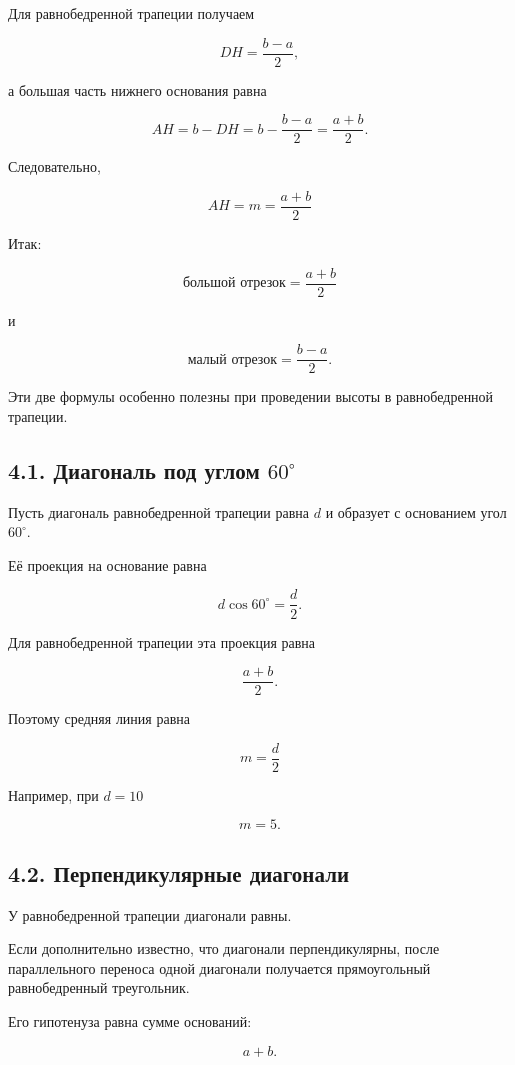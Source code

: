 \documentclass[a4paper,12pt]{article}
\newcommand{\formula}[1]{
  \[
  \boxed{#1}
  \]
}
\begin{document}
Для равнобедренной трапеции получаем

\[
DH=\frac{b-a}{2},
\]

а большая часть нижнего основания равна

\[
AH
=
b-DH
=
b-\frac{b-a}{2}
=
\frac{a+b}{2}.
\]

Следовательно,

\formula{
AH=m=\frac{a+b}{2}
}

Итак:

\[
\boxed{
\text{большой отрезок}
=
\frac{a+b}{2}
}
\]

и

\[
\boxed{
\text{малый отрезок}
=
\frac{b-a}{2}
}.
\]

Эти две формулы особенно полезны при проведении высоты в равнобедренной
трапеции.


\subsection*{4.1. Диагональ под углом $60^\circ$}

Пусть диагональ равнобедренной трапеции равна $d$ и образует с основанием
угол $60^\circ$.

Её проекция на основание равна

\[
d\cos60^\circ
=
\frac d2.
\]

Для равнобедренной трапеции эта проекция равна

\[
\frac{a+b}{2}.
\]

Поэтому средняя линия равна

\formula{
m=\frac d2
}

Например, при $d=10$

\[
m=5.
\]


\subsection*{4.2. Перпендикулярные диагонали}

У равнобедренной трапеции диагонали равны.

Если дополнительно известно, что диагонали перпендикулярны, после
параллельного переноса одной диагонали получается прямоугольный
равнобедренный треугольник.

Его гипотенуза равна сумме оснований:

\[
a+b.
\]
\end{document}
